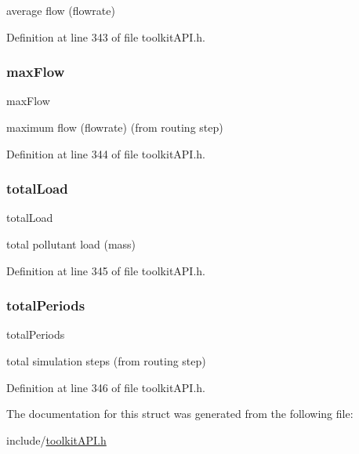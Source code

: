 average flow (flowrate) 

Definition at line 343 of file toolkit\+A\+P\+I.\+h.

\mbox{\label{struct_s_m___outfall_stats_a4d84bca5454f3903c44fe865e44674f5}} 
\subsubsection{\texorpdfstring{maxFlow}{maxFlow}}
{\footnotesize\ttfamily max\+Flow}

maximum flow (flowrate) (from routing step) 

Definition at line 344 of file toolkit\+A\+P\+I.\+h.

\mbox{\label{struct_s_m___outfall_stats_a07bf14d41a8a678b2cad797d53f84fa8}} 
\subsubsection{\texorpdfstring{totalLoad}{totalLoad}}
{\footnotesize\ttfamily total\+Load}

total pollutant load (mass) 

Definition at line 345 of file toolkit\+A\+P\+I.\+h.

\mbox{\label{struct_s_m___outfall_stats_a60fffeca33e0487e4b7cac3898b2cf05}} 
\subsubsection{\texorpdfstring{totalPeriods}{totalPeriods}}
{\footnotesize\ttfamily total\+Periods}

total simulation steps (from routing step) 

Definition at line 346 of file toolkit\+A\+P\+I.\+h.



The documentation for this struct was generated from the following file\+:\begin{DoxyCompactItemize}
\item 
include/\mbox{\hyperlink{toolkit_a_p_i_8h}{toolkit\+A\+P\+I.\+h}}\end{DoxyCompactItemize}
